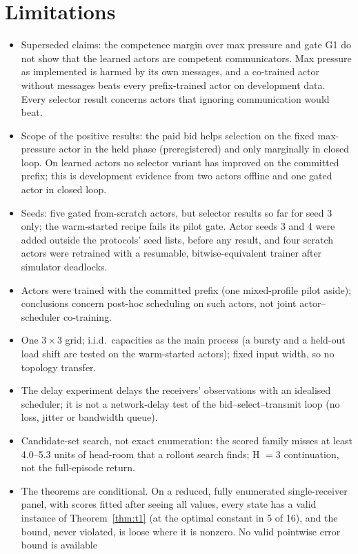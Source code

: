 \documentclass[11pt]{article}
\theoremstyle{definition}
\begin{document}
\section{Limitations}
\begin{itemize}
\item Superseded claims: the competence margin over max pressure and gate G1 do not show that the learned
actors are competent communicators. Max pressure as implemented is harmed by its own messages, and a
co-trained actor without messages beats every prefix-trained actor on development data. Every selector result
concerns actors that ignoring communication would beat.
\item Scope of the positive results: the paid bid helps selection on the fixed max-pressure actor in
the held phase (preregistered) and only marginally in closed loop. On learned actors no selector
variant has improved on the committed prefix; this is development evidence from two actors offline and
one gated actor in closed loop.
\item Seeds: five gated from-scratch actors, but selector results so far for seed 3 only; the
warm-started recipe fails its pilot gate. Actor seeds 3 and 4 were added outside the protocols' seed
lists, before any result, and four scratch actors were retrained with a resumable, bitwise-equivalent
trainer after simulator deadlocks.
\item Actors were trained with the committed prefix (one mixed-profile pilot aside); conclusions concern
post-hoc scheduling on such actors, not joint actor--scheduler co-training.
\item One $3\times3$ grid; i.i.d.\ capacities as the main process (a bursty and a held-out load shift are
tested on the warm-started actors); fixed input width, so no topology transfer.
\item The delay experiment delays the receivers' observations with an idealised scheduler; it is not
a network-delay test of the bid--select--transmit loop (no loss, jitter or bandwidth queue).
\item Candidate-set search, not exact enumeration: the scored family misses at least 4.0--5.3 units of
head-room that a rollout search finds; H $=3$ continuation, not the full-episode return.
\item The theorems are conditional. On a reduced, fully enumerated single-receiver panel, with scores
fitted after seeing all values, every state has a valid instance of Theorem~\ref{thm:t1} (at the
optimal constant in 5 of 16), and the bound, never violated, is loose where it is nonzero. No valid pointwise error bound is available

\end{itemize}
\end{document}
